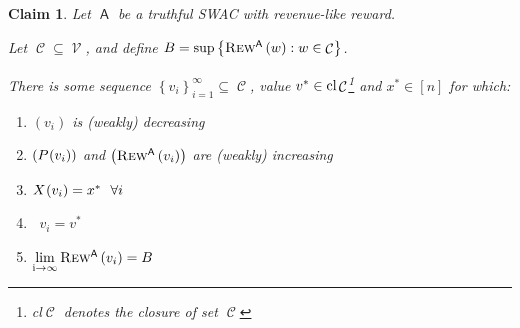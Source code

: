 \documentclass[11pt,letterpaper]{article}
\newcommand{\set}[1]{\left\{#1\right\}}
\newcommand{\brackets}[1]{\left( #1 \right)}
\newcommand{\swac}{SWAC\xspace}
\DeclareMathOperator{\A}{\auc{A}}
\DeclareMathOperator{\C}{\mathcal{C}}
\DeclareMathOperator{\V}{\mathcal{V}}
\newcommand{\vstar}{{v^*}}
\newcommand{\xstar}{{x^*}}
\DeclareMathOperator*{\mylim}{\lim\limits_{i\rightarrow\infty}}
\theoremstyle{plain}
\newtheorem{claim}{Claim}
\newcommand{\auc}[1]{\mathsf{#1}}
\begin{document}
\begin{claim}\label{claim:sequence_to_supremum}
    Let $\A$ be a truthful \swac with revenue-like reward.
    
    Let $\C\subseteq\V$, and define $B=\sup\set{\trew[\A]{w}:w\in\C}$.

    There is some sequence $\set{v_i}_{i=1}^{\infty}\subseteq\C$, value $\vstar\in\textnormal{cl}\C$\footnote{\textnormal{cl}$\C$ denotes the closure of set $\C$} and $\xstar\in[n]$ for which:
    \begin{enumerate}
        \item $(v_i)$ is (weakly) decreasing\label{item:1_sequence_to_supremum}
        \item $\brackets{\p{v_i}}$ and $\brackets{\trew[\A]{v_i}}$ are (weakly) increasing\label{item:2_sequence_to_supremum}
        \item $\x{v_i}=\xstar\ \ \forall i$\label{item:3_sequence_to_supremum}
        \item $\mylim v_i=\vstar$\label{item:4_sequence_to_supremum}
        \item $\mylim \trew[\A]{v_i}=B$\label{item:5_sequence_to_supremum}
    \end{enumerate}
\end{claim}
\end{document}
